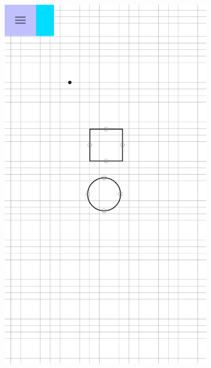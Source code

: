\begin{itemize}
	\vspace*{\fill}
		\begin{figure}[!h]
			\centering
			\begin{subfigure}[t]{.27\textwidth}
				\includegraphics[width=\textwidth]{img/screen/colladia_draw_view_zoom_out}
			\end{subfigure}
			~
			\begin{subfigure}[t]{.27\textwidth}

\end{subfigure}
\end{figure}
\end{itemize}
